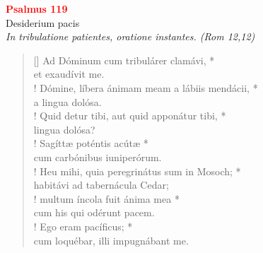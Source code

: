 


\def\greinitialformat#1{%
{\fontsize{39}{39}\selectfont #1}%
}




\vspace{0.3cm}
\begin{center}
 \textcolor{red}{\large \bf Psalmus 119}\\
Desiderium pacis\\
\textit{\small In tribulatione patientes, oratione instantes. (Rom 12,12)}
\end{center}
\begin{verse}[\versewidth]
Ad Dóminum cum tribulárer clamávi, *\\
et exaudívit me.\\!
\vin Dómine, líbera ánimam meam a lábiis mendácii, *\\
\vin a lingua dolósa.\\!
Quid detur tibi, aut quid apponátur tibi, *\\
lingua dolósa?\\!
\vin Sagíttæ poténtis acútæ *\\
\vin cum carbónibus iuniperórum.\\!
Heu mihi, quia peregrinátus sum in Mosoch; *\\
habitávi ad tabernácula Cedar;\\!
\vin multum íncola fuit ánima mea *\\
\vin cum his qui odérunt pacem.\\!
Ego eram pacíficus; *\\
cum loquébar, illi impugnábant me.\\
\end{verse}
\vspace{1cm}


